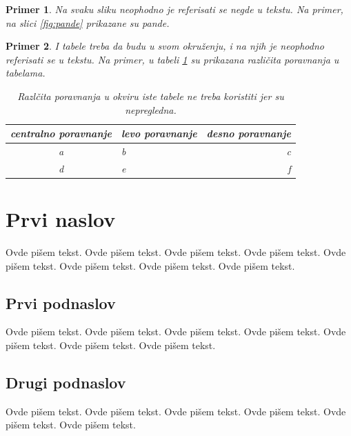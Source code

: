 \documentclass[a4paper]{article}
\newtheorem{primer}{Primer}[section]
\begin{document}
{\begin{primer}
Na svaku sliku neophodno je referisati se negde u tekstu. Na primer, na slici \ref{fig:pande} prikazane su pande. 
\end{primer}

\begin{primer} I tabele treba da budu u svom okruženju, i na njih je neophodno referisati se u tekstu. Na primer, u tabeli \ref{tab:tabela1} su prikazana različita poravnanja u tabelama.

\begin{table}[h!]
\begin{center}
\caption{Razlčita poravnanja u okviru iste tabele ne treba koristiti jer su nepregledna.}
\begin{tabular}{|c|l|r|} \hline
centralno poravnanje& levo poravnanje& desno poravnanje\\ \hline
a &b&c\\ \hline
d &e&f\\ \hline
\end{tabular}
\label{tab:tabela1}
\end{center}
\end{table}

\end{primer}





\section{Prvi naslov}
\label{sec:naslov1}


Ovde pišem tekst. 
Ovde pišem tekst. 
Ovde pišem tekst. 
Ovde pišem tekst. 
Ovde pišem tekst. 
Ovde pišem tekst. 
Ovde pišem tekst. 
Ovde pišem tekst. 


\subsection{Prvi podnaslov}
\label{subsec:podnaslov1}

Ovde pišem tekst. 
Ovde pišem tekst. 
Ovde pišem tekst. 
Ovde pišem tekst. 
Ovde pišem tekst. 
Ovde pišem tekst. 
Ovde pišem tekst. 

\subsection{Drugi podnaslov}
\label{subsec:podnaslov2}

Ovde pišem tekst. 
Ovde pišem tekst. 
Ovde pišem tekst. 
Ovde pišem tekst. 
Ovde pišem tekst. 
Ovde pišem tekst. 

}
\end{document}
